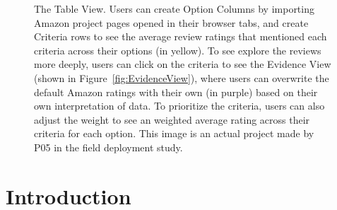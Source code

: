 \begin{figure}
    \centering
    \textcolor{gray}{}
    \caption[The Table View for \SYSTEM]{The Table View. Users can create Option Columns by importing Amazon project pages opened in their browser tabs, and create Criteria rows to see the average review ratings that mentioned each criteria across their options (in yellow). To see explore the reviews more deeply, users can click on the criteria to see the Evidence View (shown in Figure~\ref{fig:EvidenceView}), where users can overwrite the default Amazon ratings with their own (in purple) based on their own interpretation of data. To prioritize the criteria, users can also adjust the weight to see an weighted average rating across their criteria for each option. This image is an actual project made by P05 in the field deployment study.}
    \label{fig:TableView}
\end{figure}

\section{Introduction}

